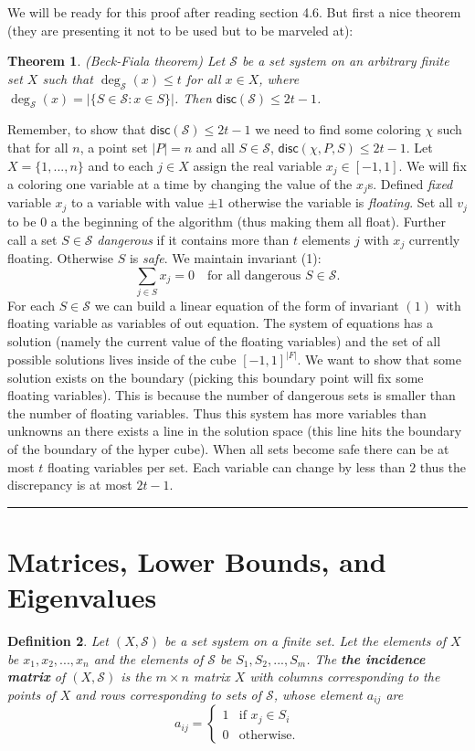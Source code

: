 \documentclass[twoside]{article}
\newcounter{lecnum}
\newtheorem{theorem}{Theorem}[lecnum]
\newtheorem{definition}[theorem]{Definition}
\newenvironment{proof}{{\bf Proof:}}{\hfill\rule{2mm}{2mm}}
\newcommand\disc{\mathsf{disc}}
\newcommand\SSet{\mathcal{S}}
\begin{document}
We will be ready for this proof after reading section 4.6. But first a nice theorem (they are presenting it not to be used but to be marveled at):
\begin{theorem}
(Beck-Fiala theorem) Let $\SSet$ be a set system on an arbitrary finite set $X$ such that $\deg_{\SSet}(x) \leq t$ for all $x \in X$, where $\deg_{\SSet}(x) = |\{S \in \SSet: x \in S\}|$. Then $\disc(\SSet) \leq 2t-1$.
\end{theorem}
\begin{proof}
Remember, to show that $\disc(\SSet) \leq 2t - 1$ we need to find some coloring $\chi$ such that for all $n$, a point set $|P| = n$ and all $S \in \SSet$, $\disc(\chi, P, S) \leq 2t - 1$. Let $X = \{1, ..., n\}$ and to each $j \in X$ assign the real variable $x_j \in [-1, 1]$. We will fix a coloring one variable at a time by changing the value of the $x_j$s. Defined \emph{fixed} variable $x_j$ to a variable with value $\pm 1$ otherwise the variable is \emph{floating}. Set all $v_j$ to be $0$ a the beginning of the algorithm (thus making them all float). Further call a set $S \in \SSet$ \emph{dangerous} if it contains more than $t$ elements $j$ with $x_j$ currently floating. Otherwise $S$ is \emph{safe}. We maintain invariant (1):
\[\sum_{j \in S} x_j = 0 \quad \mbox{for all dangerous } S \in \SSet.\]
For each $S \in \SSet$ we can build a linear equation of the form of invariant $(1)$ with floating variable as variables of out equation. The system of equations has a solution (namely the current value of the floating variables) and the set of all possible solutions lives inside of the cube $[-1, 1]^{|F|}$. We want to show that some solution exists on the boundary (picking this boundary point will fix some floating variables). This is because the number of dangerous sets is smaller than the number of floating variables. Thus this system has more variables than unknowns an there exists a line in the solution space (this line hits the boundary of the boundary of the hyper cube). When all sets become safe there can be at most $t$ floating variables per set. Each variable can change by less than $2$ thus the discrepancy is at most $2t-1$. 
\end{proof}

\section{Matrices, Lower Bounds, and Eigenvalues}
\begin{definition}
Let $(X, \SSet)$ be a set system on a finite set. Let the elements of $X$ be $x_1, x_2, ..., x_n$ and the elements of $\SSet$ be $S_1, S_2, ..., S_m$. The \textbf{the incidence matrix} of $(X, \SSet)$ is the $m \times n$ matrix $X$ with columns corresponding to the points of $X$ and rows corresponding to sets of $\SSet$, whose element $a_{ij}$ are 
\[a_{ij} = \begin{cases}
	1 &\mbox{if }x_j \in S_i\\
	0 &\mbox{otherwise.}
\end{cases}\]
\end{definition}
\end{document}
